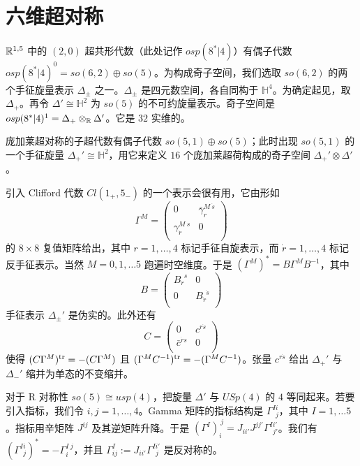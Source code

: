 \section{六维超对称}
\label{app:Six-Super}

$\mathbb{R}^{1,5}$ 中的 $(2,0)$ 超共形代数（此处记作 $osp(8^*\vert 4)$）有偶子代数 $osp(8^*\vert 4)^0 = so(6,2) \oplus so(5)$。为构成奇子空间，我们选取 $so(6,2)$ 的两个手征旋量表示 $\Delta_\pm$ 之一。$\Delta_\pm$ 是四元数空间，各自同构于 $\mathbb{H}^4$。为确定起见，取 $\Delta_+$。再令 $\Delta'\cong \mathbb{H}^2$ 为 $so(5)$ 的不可约旋量表示。奇子空间是 $osp(8^*\vert 4)^1 = \Delta_+ \otimes_{\mathbb{R}} \Delta'$。它是 $32$ 实维的。

庞加莱超对称的子超代数有偶子代数 $so(5,1) \oplus so(5)$；此时出现 $so(5,1)$ 的一个手征旋量 $\Delta_+'\cong \mathbb{H}^2$，用它来定义 $16$ 个庞加莱超荷构成的奇子空间 $\Delta_+'\otimes \Delta'$。

引入 Clifford 代数 $Cl(1_+,5_-)$ 的一个表示会很有用，它由形如
%
\begin{equation}
\Gamma^M = \begin{pmatrix} 0 & \bar\gamma^{M~\dot s}_{r}   \\    \gamma^{M~ s}_{\dot r} & 0 \\ \end{pmatrix}
\end{equation}
%
的 $8\times 8$ 复值矩阵给出，其中 $r=1, \dots,4 $ 标记手征自旋表示，而 $\dot r = 1, \dots, 4$ 标记反手征表示。当然 $M=0,1,\dots 5$ 跑遍时空维度。于是 $(\Gamma^M)^*  = B \Gamma^M B^{-1} $，其中
%
\begin{equation}
B = \begin{pmatrix} B_{r}^{~~s} & 0 \\ 0 & B_{\dot r}^{~~ \dot s} \\ \end{pmatrix}
\end{equation}
%
手征表示 $\Delta_\pm'$ 是伪实的。此外还有
%
\begin{equation}
C = \begin{pmatrix} 0 & c^{r \dot s} \\ \bar c^{\dot r s} & 0 \\ \end{pmatrix}
\end{equation}
%
使得 $(C \Gamma^M)^{\rm tr} = - (C \Gamma^M)$ 且 $(\Gamma^M C^{-1})^{\rm tr} = - (\Gamma^M C^{-1})$。张量 $c^{r \dot  s}$ 给出 $\Delta_+'$ 与 $\Delta_-'$ 缩并为单态的不变缩并。

对于 R 对称性 $so(5)\cong usp(4)$，把旋量 $\Delta'$ 与 $USp(4)$ 的 $4$ 等同起来。若要引入指标，我们令 $i,j =1,\dots, 4$。Gamma 矩阵的指标结构是 $\Gamma^{Ii}_{~~j}$，其中 $I=1, \dots 5$。指标用辛矩阵 $J^{ij}$ 及其逆矩阵升降。于是 $(\Gamma^I)_{i}^{~j} = J_{ii'} J^{jj'} \Gamma^{Ii'}_{~~j'}$。我们有 $(\Gamma^{Ii}_{~~j})^* = - \Gamma^{I~j}_{i}$，并且 $\Gamma^I_{ij} := J_{ii'} \Gamma^{Ii'}_{~~j}$ 是反对称的。

